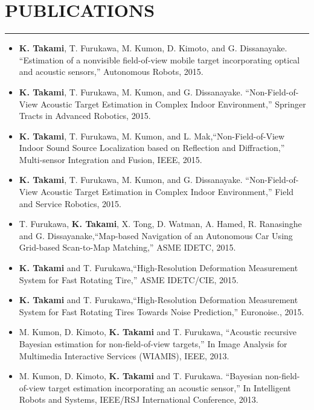 \documentclass[10pt,letterpaper]{article}
\begin{document}
\section*{PUBLICATIONS}
\vspace{-2mm}
\hrule
\begin{itemize}[label={}]
\item {\bf K. Takami}, T. Furukawa, M. Kumon, D. Kimoto, and G. Dissanayake. ``Estimation of a nonvisible field-of-view mobile target incorporating optical and acoustic sensors,'' Autonomous Robots, 2015.

\item {\bf K. Takami}, T. Furukawa, M. Kumon, and G. Dissanayake. ``Non-Field-of-View Acoustic Target Estimation in Complex Indoor Environment,'' Springer Tracts in Advanced Robotics, 2015.

\item  {\bf K. Takami}, T. Furukawa, M. Kumon, and L. Mak,``Non-Field-of-View Indoor Sound Source Localization based on Reflection and Diffraction,'' Multi-sensor Integration and Fusion, IEEE, 2015.

\item {\bf K. Takami}, T. Furukawa, M. Kumon, and G. Dissanayake. ``Non-Field-of-View Acoustic Target Estimation in Complex Indoor Environment,'' Field and Service Robotics, 2015.

\item  T. Furukawa, {\bf K. Takami}, X. Tong, D. Watman, A. Hamed, R. Ranasinghe and G. Dissayanake,``Map-based Navigation of an Autonomous Car Using Grid-based Scan-to-Map Matching,'' ASME IDETC, 2015.

\item  {\bf K. Takami} and T. Furukawa,``High-Resolution Deformation Measurement System for Fast Rotating Tire,'' ASME IDETC/CIE, 2015.



\item  {\bf K. Takami} and T. Furukawa,``High-Resolution Deformation Measurement System for Fast Rotating Tires Towards Noise Prediction,'' Euronoise., 2015.

\item M. Kumon, D. Kimoto, {\bf K. Takami} and T. Furukawa, ``Acoustic recursive Bayesian estimation for non-field-of-view targets,'' In Image Analysis for Multimedia Interactive Services (WIAMIS), IEEE, 2013.

\item M. Kumon, D. Kimoto, {\bf K. Takami} and T. Furukawa. ``Bayesian non-field-of-view target estimation incorporating an acoustic sensor,'' In Intelligent Robots and Systems, IEEE/RSJ International Conference, 2013.


\end{itemize}
\end{document}
